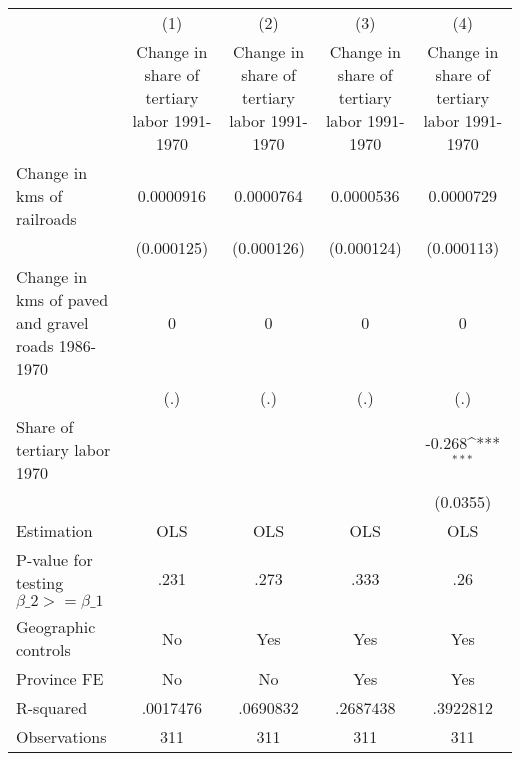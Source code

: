{
\def\sym#1{\ifmmode^{#1}\else\(^{#1}\)\fi}
\begin{tabular}{l*{4}{c}}
\hline\hline
                &\multicolumn{1}{c}{(1)}&\multicolumn{1}{c}{(2)}&\multicolumn{1}{c}{(3)}&\multicolumn{1}{c}{(4)}\\
                &\multicolumn{1}{c}{Change in share of tertiary labor 1991-1970}&\multicolumn{1}{c}{Change in share of tertiary labor 1991-1970}&\multicolumn{1}{c}{Change in share of tertiary labor 1991-1970}&\multicolumn{1}{c}{Change in share of tertiary labor 1991-1970}\\
\hline
Change in kms of railroads&0.0000916         &0.0000764         &0.0000536         &0.0000729         \\
                &(0.000125)         &(0.000126)         &(0.000124)         &(0.000113)         \\
[1em]
Change in kms of paved and gravel roads 1986-1970&        0         &        0         &        0         &        0         \\
                &      (.)         &      (.)         &      (.)         &      (.)         \\
[1em]
Share of tertiary labor 1970&                  &                  &                  &   -0.268\sym{***}\\
                &                  &                  &                  & (0.0355)         \\
\hline
Estimation      &      OLS         &      OLS         &      OLS         &      OLS         \\
P-value for testing $\beta\_2 >= \beta\_1$&     .231         &     .273         &     .333         &      .26         \\
Geographic controls&       No         &      Yes         &      Yes         &      Yes         \\
Province FE     &       No         &       No         &      Yes         &      Yes         \\
R-squared       & .0017476         & .0690832         & .2687438         & .3922812         \\
Observations    &      311         &      311         &      311         &      311         \\
\hline\hline
\end{tabular}
}
